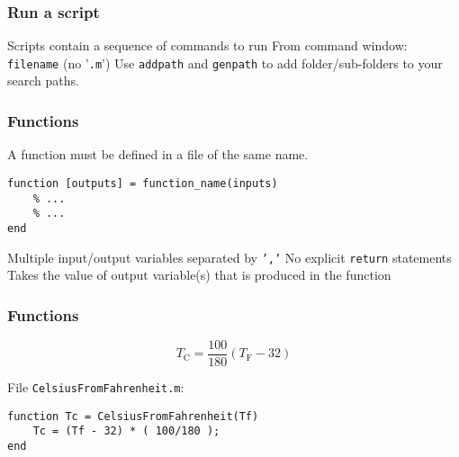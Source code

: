 \documentclass[11pt]{beamer}
\begin{document}
\begin{frame}[fragile]
  \frametitle{Run a script}
  \Enlarge

  \begin{enumerate}
  \myitem  Scripts contain a sequence of commands to run %
  \myitem  From command window: \texttt{filename} (no '\texttt{.m}')
  \myitem Use \texttt{addpath} and \texttt{genpath} to add folder/sub-folders to your search paths.
  \end{enumerate}
\end{frame}

\begin{frame}[fragile]
  \frametitle{Functions}
  \Enlarge

  \begin{enumerate}
  \myitem  A function must be defined in a file of the same name.
  \end{enumerate}
  \begin{Verbatim}
function [outputs] = function_name(inputs)
    % ...
    % ...
end
  \end{Verbatim}
  \begin{enumerate}
  \myitem Multiple input/output variables separated by \texttt{','} 
  \myitem No explicit \texttt{return} statements
  \myitem  Takes the value of output variable(s) that is produced in the function
  \end{enumerate}
\end{frame}



\begin{frame}[fragile]
  \frametitle{Functions}
  \Enlarge

$$
T_{\text{C}} = \frac{100}{180} (T_{\text{F}} - 32) 
$$

File \texttt{CelsiusFromFahrenheit.m}:
  \begin{Verbatim}
function Tc = CelsiusFromFahrenheit(Tf)
    Tc = (Tf - 32) * ( 100/180 );
end
  \end{Verbatim}
\end{frame}
\end{document}

